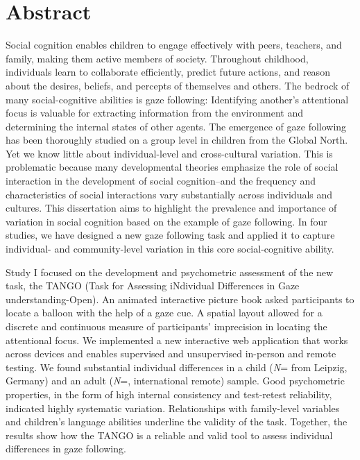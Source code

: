 \documentclass[
]{scrbook}
\begin{document}
\chapter{Abstract}\label{abstract}

Social cognition enables children to engage effectively with peers, teachers, and family, making them active members of society. Throughout childhood, individuals learn to collaborate efficiently, predict future actions, and reason about the desires, beliefs, and percepts of themselves and others. The bedrock of many social-cognitive abilities is gaze following: Identifying another's attentional focus is valuable for extracting information from the environment and determining the internal states of other agents. The emergence of gaze following has been thoroughly studied on a group level in children from the Global North. Yet we know little about individual-level and cross-cultural variation. This is problematic because many developmental theories emphasize the role of social interaction in the development of social cognition\thinspace --\thinspace and the frequency and characteristics of social interactions vary substantially across individuals and cultures. This dissertation aims to highlight the prevalence and importance of variation in social cognition based on the example of gaze following. In four studies, we have designed a new gaze following task and applied it to capture individual- and community-level variation in this core social-cognitive ability.

Study I focused on the development and psychometric assessment of the new task, the TANGO (Task for Assessing iNdividual Differences in Gaze understanding-Open). An animated interactive picture book asked participants to locate a balloon with the help of a gaze cue. A spatial layout allowed for a discrete and continuous measure of participants' imprecision in locating the attentional focus. We implemented a new interactive web application that works across devices and enables supervised and unsupervised in-person and remote testing. We found substantial individual differences in a child (\emph{N}\thinspace= from Leipzig, Germany) and an adult (\emph{N}\thinspace =, international remote) sample. Good psychometric properties, in the form of high internal consistency and test-retest reliability, indicated highly systematic variation. Relationships with family-level variables and children's language abilities underline the validity of the task. Together, the results show how the TANGO is a reliable and valid tool to assess individual differences in gaze following.
\end{document}
